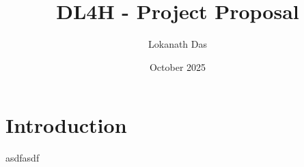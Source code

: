 \documentclass{article}
\title{DL4H - Project Proposal}
\author{Lokanath Das}
\date{October 2025}
\begin{document}
\maketitle

\section{Introduction}
asdfasdf
\end{document}
